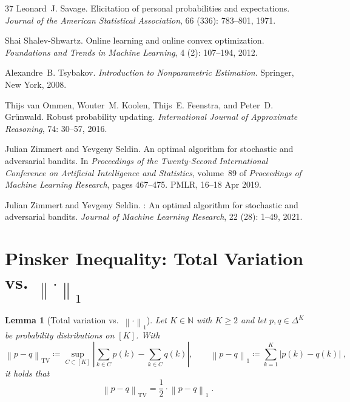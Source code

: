 \documentclass[11pt,oneside,a4paper]{article}
\newcommand{\labs}[1]{\left\lvert#1\right\rvert}
\newcommand{\lno}[1]{\left\lVert#1\right\rVert}
\theoremstyle{plain}
\newtheorem{lemma}[theorem]{Lemma}
\theoremstyle{definition}
\theoremstyle{remark}
\newcommand{\simplex}[1]{\Delta^{#1}}
\newcommand{\TV}[2]{\lno{ #1 - #2 }_{\textrm{TV}} }
\begin{document}
\begin{thebibliography}{37}
Leonard~J. Savage.
\newblock Elicitation of personal probabilities and expectations.
\newblock \emph{Journal of the American Statistical Association}, 66 (336): 783--801, 1971.

Shai Shalev-Shwartz.
\newblock Online learning and online convex optimization.
\newblock \emph{Foundations and Trends{\textregistered} in Machine Learning}, 4 (2): 107--194, 2012.

Alexandre~B. Tsybakov.
\newblock \emph{Introduction to Nonparametric Estimation}.
\newblock Springer, New York, 2008.

Thijs van Ommen, Wouter~M. Koolen, Thijs~E. Feenstra, and Peter~D. Gr{\"u}nwald.
\newblock Robust probability updating.
\newblock \emph{International Journal of Approximate Reasoning}, 74: 30--57, 2016.

Julian Zimmert and Yevgeny Seldin.
\newblock An optimal algorithm for stochastic and adversarial bandits.
\newblock In \emph{Proceedings of the Twenty-Second International Conference on Artificial Intelligence and Statistics}, volume~89 of \emph{Proceedings of Machine Learning Research}, pages 467--475. PMLR, 16--18 Apr 2019.

Julian Zimmert and Yevgeny Seldin.
: An optimal algorithm for stochastic and adversarial bandits.
\newblock \emph{Journal of Machine Learning Research}, 22 (28): 1--49, 2021.

\end{thebibliography}
\appendix
\section{Pinsker Inequality: Total Variation vs. \texorpdfstring{$\lno{\cdot}_1$}{L1 Norm }}
\label{s:TVvsEll1}

\begin{lemma}[Total variation vs.\ $\lno{\cdot}_1$]
Let $K\in\mathbb{N}$ with $K \ge 2$ and let $p,q\in\simplex{K}$ be probability distributions on $[K]$.
With
\[
    \TV{p}{q} \coloneqq \sup_{C\subset [K]} \labs{\sum_{k\in C}p(k)-\sum_{k\in C}q(k)},
\qquad
    \lno{p-q}_1 \coloneqq \sum_{k=1}^K \labs{p(k)-q(k)}\;,
\]
it holds that
\[
    \TV{p}{q}
=
    \frac{1}{2}\cdot \lno{p-q}_1\;.
\]
\end{lemma}
\end{document}
